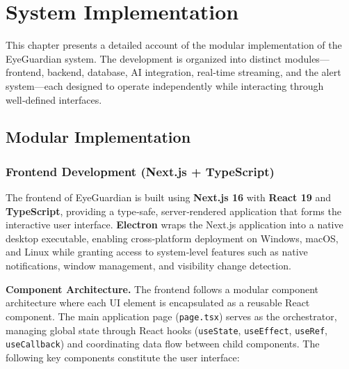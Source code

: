 \documentclass[12pt]{report}
\begin{document}

\chapter{System Implementation}

This chapter presents a detailed account of the modular implementation of the EyeGuardian system. The development is organized into distinct modules—frontend, backend, database, AI integration, real‑time streaming, and the alert system—each designed to operate independently while interacting through well‑defined interfaces.

\section{Modular Implementation}

\subsection{Frontend Development (Next.js + TypeScript)}

The frontend of EyeGuardian is built using \textbf{Next.js 16} with \textbf{React 19} and \textbf{TypeScript}, providing a type‑safe, server‑rendered application that forms the interactive user interface. \textbf{Electron} wraps the Next.js application into a native desktop executable, enabling cross‑platform deployment on Windows, macOS, and Linux while granting access to system‑level features such as native notifications, window management, and visibility change detection.

\textbf{Component Architecture.} The frontend follows a modular component architecture where each UI element is encapsulated as a reusable React component. The main application page (\texttt{page.tsx}) serves as the orchestrator, managing global state through React hooks (\texttt{useState}, \texttt{useEffect}, \texttt{useRef}, \texttt{useCallback}) and coordinating data flow between child components. The following key components constitute the user interface:
\end{document}
